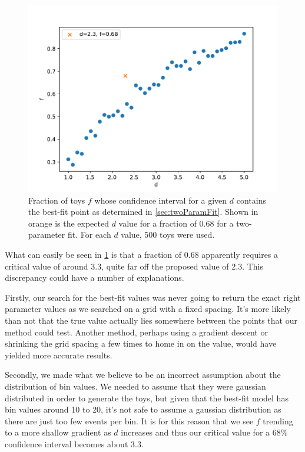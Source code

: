 \documentclass[11pt]{article}
\numberwithin{equation}{section}
\numberwithin{figure}{section}
\numberwithin{table}{section}
\begin{document}
\begin{figure}[h]
    \begin{center}
        \includegraphics[width=.8\textwidth]{Plots/d_f.pdf}
        \caption{Fraction of toys $f$ whose confidence interval for a given $d$ contains the best-fit point as determined in \cref{sec:twoParamFit}. Shown in orange is the expected $d$ value for a fraction of 0.68 for a two-parameter fit. For each $d$ value, 500 toys were used.}
        \label{fig:d_f}
    \end{center}
\end{figure}

What can easily be seen in \cref{fig:d_f} is that a fraction of 0.68 apparently requires a critical value of around 3.3, quite far off the proposed value of 2.3. This discrepancy could have a number of explanations. 

Firstly, our search for the best-fit values was never going to return the exact right parameter values as we searched on a grid with a fixed spacing. It's more likely than not that the true value actually lies somewhere between the points that our method could test. Another method, perhaps using a gradient descent or shrinking the grid spacing a few times to home in on the value, would have yielded more accurate results. 

Secondly, we made what we believe to be an incorrect assumption about the distribution of bin values. We needed to assume that they were gaussian distributed in order to generate the toys, but given that the best-fit model has bin values around 10 to 20, it's not safe to assume a gaussian distribution as there are just too few events per bin. It is for this reason that we see $f$ trending to a more shallow gradient as $d$ increases and thus our critical value for a $68\%$ confidence interval becomes about 3.3. 
\end{document}
